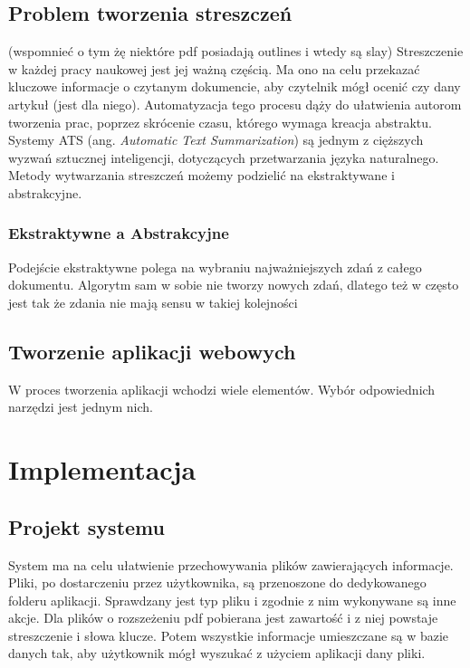 \documentclass[12pt,a4paper,twoside]{article}
\begin{document}
\subsection{Problem tworzenia streszczeń}
(wspomnieć o tym żę niektóre pdf posiadają outlines i wtedy są slay)
Streszczenie w każdej pracy naukowej jest jej ważną częścią. Ma ono na celu przekazać kluczowe informacje o czytanym dokumencie, aby czytelnik mógł ocenić czy dany artykuł (jest dla niego). Automatyzacja tego procesu dąży do ułatwienia autorom tworzenia prac, poprzez skrócenie czasu, którego wymaga kreacja abstraktu. Systemy ATS (ang. \textit{Automatic Text Summarization}) są jednym z cięższych wyzwań sztucznej inteligencji, dotyczących przetwarzania języka naturalnego. Metody wytwarzania streszczeń możemy podzielić na ekstraktywane i abstrakcyjne.
\subsubsection*{Ekstraktywne a Abstrakcyjne}
Podejście ekstraktywne polega na wybraniu najważniejszych zdań z całego dokumentu. Algorytm sam w sobie nie tworzy nowych zdań, dlatego też w często jest tak że zdania nie mają sensu w takiej kolejności
\newpage
\subsection{Tworzenie aplikacji webowych}
W proces tworzenia aplikacji wchodzi wiele elementów. Wybór odpowiednich narzędzi jest jednym nich. 
\section{Implementacja}
\subsection{Projekt systemu}
System ma na celu ułatwienie przechowywania plików zawierających informacje. Pliki, po dostarczeniu przez użytkownika, są przenoszone do dedykowanego folderu aplikacji. Sprawdzany jest typ pliku i zgodnie z nim wykonywane są inne akcje. Dla plików o rozszeżeniu pdf pobierana jest zawartość i z niej powstaje streszczenie i słowa klucze. Potem wszystkie informacje umieszczane są w bazie danych tak, aby użytkownik mógł wyszukać z użyciem aplikacji dany pliki. \par
\end{document}
